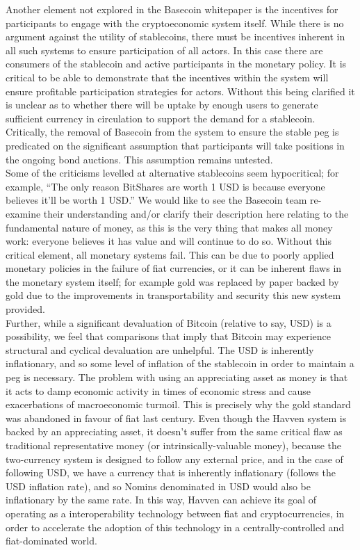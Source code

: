 \noindent Another element not explored in the Basecoin whitepaper is the incentives for participants to engage with the cryptoeconomic system itself. While there is no argument against the utility of stablecoins, there must be incentives inherent in all such systems to ensure participation of all actors. In this case there are consumers of the stablecoin and active participants in the monetary policy. It is critical to be able to demonstrate that the incentives within the system will ensure profitable participation strategies for actors. Without this being clarified it is unclear as to whether there will be uptake by enough users to generate sufficient currency in circulation to support the demand for a stablecoin. Critically, the removal of Basecoin from the system to ensure the stable peg is predicated on the significant assumption that participants will take positions in the ongoing bond auctions. This assumption remains untested. \\

\noindent Some of the criticisms levelled at alternative stablecoins seem hypocritical; for example, ``The only reason BitShares are worth 1 USD is because everyone believes it’ll be worth 1 USD.'' We would like to see the Basecoin team re-examine their understanding and/or clarify their description here relating to the fundamental nature of money, as this is the very thing that makes all money work: everyone believes it has value and will continue to do so. Without this critical element, all monetary systems fail. This can be due to poorly applied monetary policies in the failure of fiat currencies, or it can be inherent flaws in the monetary system itself; for example gold was replaced by paper backed by gold due to the improvements in transportability and security this new system provided. \\

\noindent Further, while a significant devaluation of Bitcoin (relative to say, USD) is a possibility, we feel that comparisons that imply that Bitcoin may experience structural and cyclical devaluation are unhelpful. The USD is inherently inflationary, and so some level of inflation of the stablecoin in order to maintain a peg is necessary. The problem with using an appreciating asset as money is that it acts to damp economic activity in times of economic stress and cause exacerbations of macroeconomic turmoil. This is precisely why the gold standard was abandoned in favour of fiat last century. Even though the Havven system is backed by an appreciating asset, it doesn't suffer from the same critical flaw as traditional representative money (or intrinsically-valuable money), because the two-currency system is designed to follow any external price, and in the case of following USD, we have a currency that is inherently inflationary (follows the USD inflation rate), and so Nomins denominated in USD would also be inflationary by the same rate. In this way, Havven can achieve its goal of operating as a interoperability technology between fiat and cryptocurrencies, in order to accelerate the adoption of this technology in a centrally-controlled and fiat-dominated world. \\

